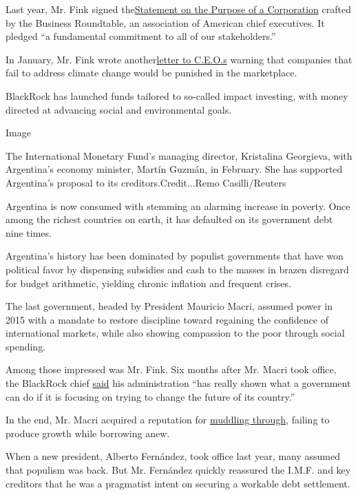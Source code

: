 Last year, Mr. Fink signed
the\href{https://www.nytimes.com/2019/08/19/business/business-roundtable-ceos-corporations.html}{Statement
on the Purpose of a Corporation} crafted by the Business Roundtable, an
association of American chief executives. It pledged ``a fundamental
commitment to all of our stakeholders.''

In January, Mr. Fink wrote
another\href{https://www.blackrock.com/corporate/investor-relations/larry-fink-ceo-letter}{letter
to C.E.O.s} warning that companies that fail to address climate change
would be punished in the marketplace.

BlackRock has launched funds tailored to so-called impact investing,
with money directed at advancing social and environmental goals.

Image

The International Monetary Fund's managing director, Kristalina
Georgieva, with Argentina's economy minister, Martín Guzmán, in
February. She has supported Argentina's proposal to its
creditors.Credit...Remo Casilli/Reuters

Argentina is now consumed with stemming an alarming increase in poverty.
Once among the richest countries on earth, it has defaulted on its
government debt nine times.

Argentina's history has been dominated by populist governments that have
won political favor by dispensing subsidies and cash to the masses in
brazen disregard for budget arithmetic, yielding chronic inflation and
frequent crises.

The last government, headed by President Mauricio Macri, assumed power
in 2015 with a mandate to restore discipline toward regaining the
confidence of international markets, while also showing compassion to
the poor through social spending.

Among those impressed was Mr. Fink. Six months after Mr. Macri took
office, the BlackRock chief
\href{https://www.youtube.com/watch?v=TM_MC2Fj-JI}{said} his
administration ``has really shown what a government can do if it is
focusing on trying to change the future of its country.''

In the end, Mr. Macri acquired a reputation for
\href{https://www.nytimes.com/2019/05/10/business/argentina-economy-macri-populism.html}{muddling
through}, failing to produce growth while borrowing anew.

When a new president, Alberto Fernández, took office last year, many
assumed that populism was back. But Mr. Fernández quickly reassured the
I.M.F. and key creditors that he was a pragmatist intent on securing a
workable debt settlement.

